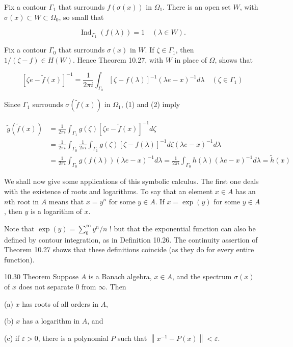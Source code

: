 \documentclass[10pt]{article}
\begin{document}
Fix a contour $\Gamma_{1}$ that surrounds $f(\sigma(x))$ in $\Omega_{1}$. There is an open set $W$, with $\sigma(x) \subset W \subset \Omega_{0}$, so small that

$$
\operatorname{Ind}_{\Gamma_{1}}(f(\lambda))=1 \quad(\lambda \in W) .
$$

Fix a contour $\Gamma_{0}$ that surrounds $\sigma(x)$ in $W$. If $\zeta \in \Gamma_{1}$, then $1 /(\zeta-f) \in H(W)$. Hence Theorem 10.27, with $W$ in place of $\Omega$, shows that

$$
[\zeta e-\tilde{f}(x)]^{-1}=\frac{1}{2 \pi i} \int_{\Gamma_{0}}[\zeta-f(\lambda)]^{-1}(\lambda e-x)^{-1} d \lambda \quad\left(\zeta \in \Gamma_{1}\right)
$$

Since $\Gamma_{1}$ surrounds $\sigma(\tilde{f}(x))$ in $\Omega_{1}$, (1) and (2) imply

$$
\begin{aligned}
\tilde{g}(\tilde{f}(x)) & =\frac{1}{2 \pi i} \int_{\Gamma_{1}} g(\zeta)[\zeta e-\tilde{f}(x)]^{-1} d \zeta \\
& =\frac{1}{2 \pi i} \int_{\Gamma_{0}} \frac{1}{2 \pi i} \int_{\Gamma_{1}} g(\zeta)[\zeta-f(\lambda)]^{-1} d \zeta(\lambda e-x)^{-1} d \lambda \\
& =\frac{1}{2 \pi i} \int_{\Gamma_{0}} g(f(\lambda))(\lambda e-x)^{-1} d \lambda=\frac{1}{2 \pi i} \int_{\Gamma_{0}} h(\lambda)(\lambda e-x)^{-1} d \lambda=\tilde{h}(x)
\end{aligned}
$$

We shall now give some applications of this symbolic calculus. The first one deals with the existence of roots and logarithms. To say that an element $x \in A$ has an $n$th root in $A$ means that $x=y^{n}$ for some $y \in A$. If $x=\exp (y)$ for some $y \in A$, then $y$ is a logarithm of $x$.

Note that $\exp (y)=\sum_{0}^{\infty} y^{n} / n$ ! but that the exponential function can also be defined by contour integration, as in Definition 10.26. The continuity assertion of Theorem 10.27 shows that these definitions coincide (as they do for every entire function).

10.30 Theorem Suppose $A$ is a Banach algebra, $x \in A$, and the spectrum $\sigma(x)$ of $x$ does not separate 0 from $\infty$. Then

(a) $x$ has roots of all orders in $A$,

(b) $x$ has a logarithm in $A$, and

(c) if $\varepsilon>0$, there is a polynomial $P$ such that $\left\|x^{-1}-P(x)\right\|<\varepsilon$.
\end{document}
